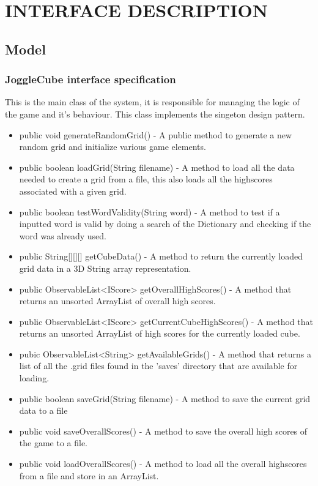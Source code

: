 \section{INTERFACE DESCRIPTION}
	\subsection{Model}
		\subsubsection{JoggleCube interface specification}
        	This is the main class of the system, it is responsible for managing the logic of the game and it's behaviour. This class implements the singeton design pattern.
         \begin{itemize}
         	\item  public void generateRandomGrid() - A public method to generate a new random grid and initialize various game elements. 
            \item public boolean loadGrid(String filename) - A method to load all the data needed to create a grid from a file, this also loads all the highscores associated with a given grid.
            \item public boolean testWordValidity(String word) - A method to test if a inputted word is valid by doing a search of the Dictionary and checking if the word was already used.
            \item public String[][][] getCubeData() - A method to return the currently loaded grid data in a 3D String array representation.
            \item public ObservableList<IScore> getOverallHighScores() - A method that returns an unsorted ArrayList of overall high scores.
            \item public ObservableList<IScore> getCurrentCubeHighScores() - A method that returns an unsorted ArrayList of high scores for the currently loaded cube.
            \item pubic ObservableList<String> getAvailableGrids() - A method that returns a list of all the .grid files found in the 'saves' directory that are available for loading.
            \item public boolean saveGrid(String filename) - A method to save the current grid data to a file
            \item public void saveOverallScores() - A method to save the overall high scores of the game to a file.
            \item public void loadOverallScores() - A method to load all the overall highscores from a file and store in an ArrayList.

\end{itemize}
